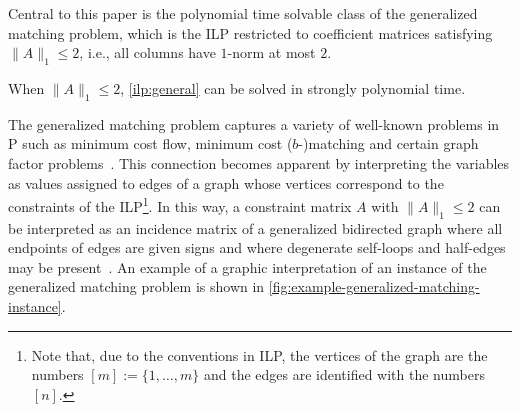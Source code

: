 \documentclass[a4paper,UKenglish,cleveref,thm-restate]{lipics-v2021}
\begin{document}
Central to this paper is the polynomial time solvable class of the generalized matching problem, which is the ILP restricted to coefficient matrices satisfying $\|A\|_1\le2$, i.e., all columns have $1$-norm at most $2$.

\begin{theorem}
    When $\|A\|_1\le2$, \cref{ilp:general} can be solved in strongly polynomial time.
    \label{thm:generalized-matching-in-p}
\end{theorem}

The generalized matching problem captures a variety of well-known problems in P such as minimum cost flow, minimum cost ($b$-)matching and certain graph factor problems~\cite{schrijver2003combinatorial}. This connection becomes apparent by interpreting the variables as values assigned to edges of a graph whose vertices correspond to the constraints of the ILP\footnote{Note that, due to the conventions in ILP, the vertices of the graph are the numbers $[m]:=\{1,\dots,m\}$ and the edges are identified with the numbers $[n]$.}. In this way, a constraint matrix $A$ with $\|A\|_1\le2$ can be interpreted as an incidence matrix of a generalized bidirected graph where all endpoints of edges are given signs and where degenerate self-loops and half-edges may be present~\cite{DBLP:conf/aussois/EdmondsJ01}. An example of a graphic interpretation of an instance of the generalized matching problem is shown in \cref{fig:example-generalized-matching-instance}.
\end{document}
